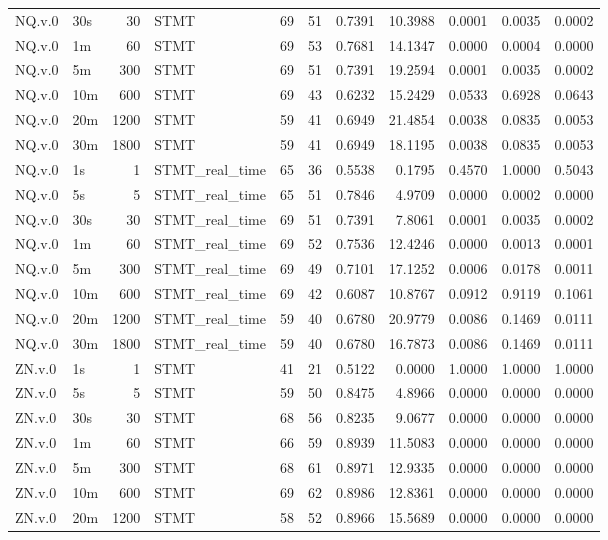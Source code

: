 \begin{tabular}{llrlrrrrrrr}
NQ.v.0 & 30s & 30 & STMT & 69 & 51 & 0.7391 & 10.3988 & 0.0001 & 0.0035 & 0.0002 \\
NQ.v.0 & 1m & 60 & STMT & 69 & 53 & 0.7681 & 14.1347 & 0.0000 & 0.0004 & 0.0000 \\
NQ.v.0 & 5m & 300 & STMT & 69 & 51 & 0.7391 & 19.2594 & 0.0001 & 0.0035 & 0.0002 \\
NQ.v.0 & 10m & 600 & STMT & 69 & 43 & 0.6232 & 15.2429 & 0.0533 & 0.6928 & 0.0643 \\
NQ.v.0 & 20m & 1200 & STMT & 59 & 41 & 0.6949 & 21.4854 & 0.0038 & 0.0835 & 0.0053 \\
NQ.v.0 & 30m & 1800 & STMT & 59 & 41 & 0.6949 & 18.1195 & 0.0038 & 0.0835 & 0.0053 \\
NQ.v.0 & 1s & 1 & STMT_real_time & 65 & 36 & 0.5538 & 0.1795 & 0.4570 & 1.0000 & 0.5043 \\
NQ.v.0 & 5s & 5 & STMT_real_time & 65 & 51 & 0.7846 & 4.9709 & 0.0000 & 0.0002 & 0.0000 \\
NQ.v.0 & 30s & 30 & STMT_real_time & 69 & 51 & 0.7391 & 7.8061 & 0.0001 & 0.0035 & 0.0002 \\
NQ.v.0 & 1m & 60 & STMT_real_time & 69 & 52 & 0.7536 & 12.4246 & 0.0000 & 0.0013 & 0.0001 \\
NQ.v.0 & 5m & 300 & STMT_real_time & 69 & 49 & 0.7101 & 17.1252 & 0.0006 & 0.0178 & 0.0011 \\
NQ.v.0 & 10m & 600 & STMT_real_time & 69 & 42 & 0.6087 & 10.8767 & 0.0912 & 0.9119 & 0.1061 \\
NQ.v.0 & 20m & 1200 & STMT_real_time & 59 & 40 & 0.6780 & 20.9779 & 0.0086 & 0.1469 & 0.0111 \\
NQ.v.0 & 30m & 1800 & STMT_real_time & 59 & 40 & 0.6780 & 16.7873 & 0.0086 & 0.1469 & 0.0111 \\
ZN.v.0 & 1s & 1 & STMT & 41 & 21 & 0.5122 & 0.0000 & 1.0000 & 1.0000 & 1.0000 \\
ZN.v.0 & 5s & 5 & STMT & 59 & 50 & 0.8475 & 4.8966 & 0.0000 & 0.0000 & 0.0000 \\
ZN.v.0 & 30s & 30 & STMT & 68 & 56 & 0.8235 & 9.0677 & 0.0000 & 0.0000 & 0.0000 \\
ZN.v.0 & 1m & 60 & STMT & 66 & 59 & 0.8939 & 11.5083 & 0.0000 & 0.0000 & 0.0000 \\
ZN.v.0 & 5m & 300 & STMT & 68 & 61 & 0.8971 & 12.9335 & 0.0000 & 0.0000 & 0.0000 \\
ZN.v.0 & 10m & 600 & STMT & 69 & 62 & 0.8986 & 12.8361 & 0.0000 & 0.0000 & 0.0000 \\
ZN.v.0 & 20m & 1200 & STMT & 58 & 52 & 0.8966 & 15.5689 & 0.0000 & 0.0000 & 0.0000 \\

\end{tabular}
